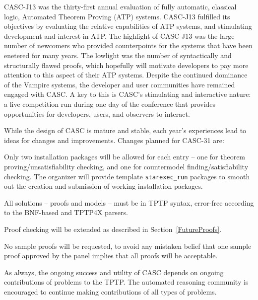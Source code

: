\documentclass[aic]{iosart2x}
\newcommand{\smalltt}[1]{\small \texttt{#1}}
\newenvironment{packed_itemize}{
\vspace*{-0.3em}
\begin{itemize}
  \setlength{\partopsep}{0pt}
  \setlength{\itemsep}{1pt}
  \setlength{\parskip}{0pt}
  \setlength{\parsep}{0pt}
}{\end{itemize}}
\newcommand{\THIS}{\mbox{CASC-J13}}
\newcommand{\NEXT}{\mbox{CASC-31}}
\newcommand{\NTHCOMPETITION}{\mbox{thirty-first}}
\begin{document}
\THIS{} was the \NTHCOMPETITION{} annual evaluation of fully automatic, classical logic, Automated
Theorem Proving (ATP) systems.
\THIS{} fulfilled its objectives by evaluating the relative capabilities of ATP systems,
and stimulating development and interest in ATP.
The highlight of \THIS{} was the large number of newcomers who provided counterpoints for the
systems that have been enetered for many years.
The lowlight was the number of syntactically and structurally flawed proofs, which hopefully will
motivate developers to pay more attention to this aspect of their ATP systems.
Despite the continued dominance of the Vampire systems, the developer and user communities have
remained engaged with CASC.
A key to this is CASC's stimulating and interactive nature: a live competition run during one day 
of the conference that provides opportunities for developers, users, and observers to interact.

While the design of CASC is mature and stable, each year's experiences lead to ideas for changes
and improvements.
Changes planned for \NEXT{} are:
\begin{packed_itemize}
\item Only two installation packages will be allowed for each entry -- one for theorem 
      proving/unsatisfiability checking, and one for countermodel finding/satisfiability checking.
      The organizer will provide template \smalltt{starexec\_run} packages to smooth out the
      creation and submission of working installation packages.
\item All solutions -- proofs and models -- must be in TPTP syntax, error-free according to 
      the BNF-based and TPTP4X parsers.
\item Proof checking will be extended as described in Section~\ref{FutureProofs}.
\item No sample proofs will be requested, to avoid any mistaken belief that one sample proof
      approved by the panel implies that all proofs will be acceptable.
\end{packed_itemize}

As always, the ongoing success and utility of CASC depends on ongoing contributions of problems
to the TPTP.
The automated reasoning community is encouraged to continue making contributions of all types of
problems.



\end{document}
